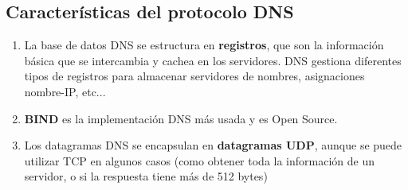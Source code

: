 \subsection{Características del protocolo DNS}
\begin{enumerate}
    \item La base de datos DNS se estructura en \textbf{registros}, que son la información básica que se intercambia y cachea en los servidores. DNS gestiona diferentes tipos de registros para almacenar servidores de nombres, asignaciones nombre-IP, etc...
    \item \textbf{BIND} es la implementación DNS más usada y es Open Source.
    \item Los datagramas DNS se encapsulan en \textbf{datagramas UDP}, aunque se puede utilizar TCP en algunos casos (como obtener toda la información de un servidor, o si la respuesta tiene más de 512 bytes)\\
    

\end{enumerate}
